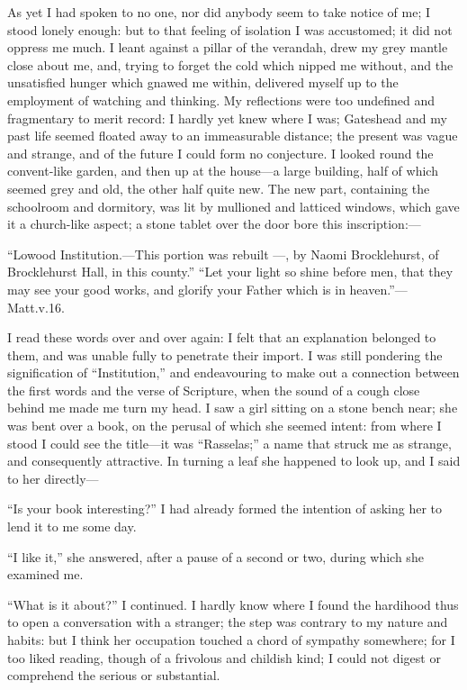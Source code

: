 As yet I had spoken to no one, nor did anybody seem to take notice of
me; I stood lonely enough: but to that feeling of isolation I was
accustomed; it did not oppress me much. I leant against a pillar of the
verandah, drew my grey mantle close about me, and, trying to forget the
cold which nipped me without, and the unsatisfied hunger which gnawed me
within, delivered myself up to the employment of watching and thinking. 
My reflections were too undefined and fragmentary to merit record: I
hardly yet knew where I was; Gateshead and my past life seemed floated
away to an immeasurable distance; the present was vague and strange, and
of the future I could form no conjecture. I looked round the
convent-like garden, and then up at the house---a large building, half
of which seemed grey and old, the other half quite new. The new part,
containing the schoolroom and dormitory, was lit by mullioned and
latticed windows, which gave it a church-like aspect; a stone tablet
over the door bore this inscription:---

\enquote{Lowood Institution.---This portion was rebuilt \AD{} ---, by
Naomi Brocklehurst, of Brocklehurst Hall, in this county.} \enquote{Let
your light so shine before men, that they may see your good works, and
glorify your Father which is in heaven.}---\St{} Matt.\@ v.\@ 16.

I read these words over and over again: I felt that an explanation
belonged to them, and was unable fully to penetrate their import. I was
still pondering the signification of \enquote{Institution,} and
endeavouring to make out a connection between the first words and the
verse of Scripture, when the sound of a cough close behind me made me
turn my head. I saw a girl sitting on a stone bench near; she was bent
over a book, on the perusal of which she seemed intent: from where I
stood I could see the title---it was \enquote{Rasselas;} a name that
struck me as strange, and consequently attractive. In turning a leaf
she happened to look up, and I said to her directly---

\enquote{Is your book interesting?} I had already formed the intention
of asking her to lend it to me some day.

\enquote{I like it,} she answered, after a pause of a second or two,
during which she examined me.

\enquote{What is it about?} I continued. I hardly know where I found
the hardihood thus to open a conversation with a stranger; the step was
contrary to my nature and habits: but I think her occupation touched a
chord of sympathy somewhere; for I too liked reading, though of a
frivolous and childish kind; I could not digest or comprehend the
serious or substantial.

